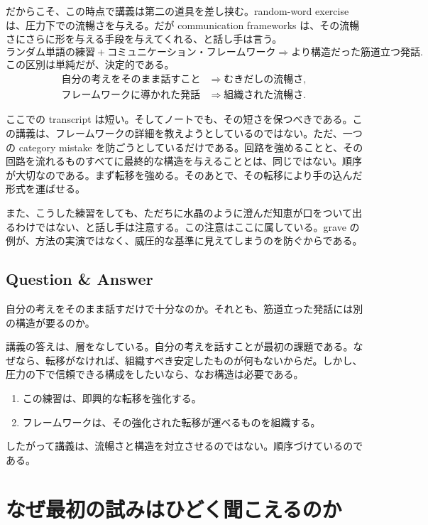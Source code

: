 だからこそ、この時点で講義は第二の道具を差し挟む。random-word exercise は、圧力下での流暢さを与える。だが communication frameworks は、その流暢さにさらに形を与える手段を与えてくれる、と話し手は言う。
\begin{equation}
\text{ランダム単語の練習} + \text{コミュニケーション・フレームワーク} \Longrightarrow \text{より構造だった筋道立つ発話}.
\end{equation}
この区別は単純だが、決定的である。
\begin{align}
\text{自分の考えをそのまま話すこと} &\Longrightarrow \text{むきだしの流暢さ},\\
\text{フレームワークに導かれた発話} &\Longrightarrow \text{組織された流暢さ}.
\end{align}

ここでの transcript は短い。そしてノートでも、その短さを保つべきである。この講義は、フレームワークの詳細を教えようとしているのではない。ただ、一つの category mistake を防ごうとしているだけである。回路を強めることと、その回路を流れるものすべてに最終的な構造を与えることとは、同じではない。順序が大切なのである。まず転移を強める。そのあとで、その転移により手の込んだ形式を運ばせる。

また、こうした練習をしても、ただちに水晶のように澄んだ知恵が口をついて出るわけではない、と話し手は注意する。この注意はここに属している。grave の例が、方法の実演ではなく、威圧的な基準に見えてしまうのを防ぐからである。

\subsection{Question \& Answer}

自分の考えをそのまま話すだけで十分なのか。それとも、筋道立った発話には別の構造が要るのか。

講義の答えは、層をなしている。自分の考えを話すことが最初の課題である。なぜなら、転移がなければ、組織すべき安定したものが何もないからだ。しかし、圧力の下で信頼できる構成をしたいなら、なお構造は必要である。
\begin{enumerate}
\item この練習は、即興的な転移を強化する。
\item フレームワークは、その強化された転移が運べるものを組織する。
\end{enumerate}
したがって講義は、流暢さと構造を対立させるのではない。順序づけているのである。

\section{なぜ最初の試みはひどく聞こえるのか}

